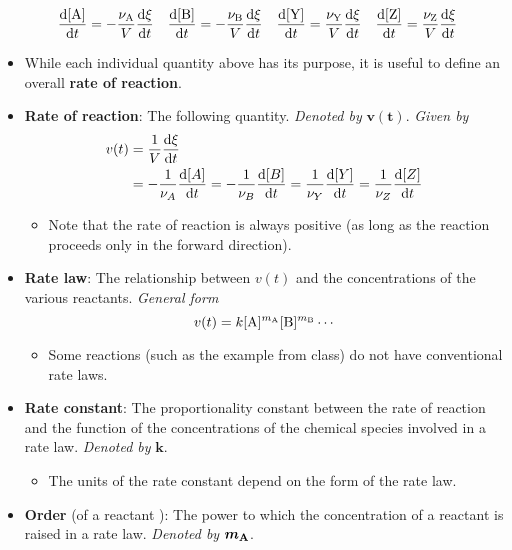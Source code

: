 \documentclass[../notes.tex]{subfiles}
\begin{document}
\begin{itemize}
    \begin{align*}
        \dv{[\ce{A}]}{t} &= -\frac{\nu_{\ce{A}}}{V}\dv{\xi}{t}&
        \dv{[\ce{B}]}{t} &= -\frac{\nu_{\ce{B}}}{V}\dv{\xi}{t}&
        \dv{[\ce{Y}]}{t} &= \frac{\nu_{\ce{Y}}}{V}\dv{\xi}{t}&
        \dv{[\ce{Z}]}{t} &= \frac{\nu_{\ce{Z}}}{V}\dv{\xi}{t}
    \end{align*}
    \item While each individual quantity above has its purpose, it is useful to define an overall \textbf{rate of reaction}.
    \item \textbf{Rate of reaction}: The following quantity. \emph{Denoted by} $\bm{v(t)}$. \emph{Given by}
    \begin{align*}
        v(t) &= \frac{1}{V}\dv{\xi}{t}\\
        &= -\frac{1}{\nu_A}\dv{[A]}{t}
            = -\frac{1}{\nu_B}\dv{[B]}{t}
            = \frac{1}{\nu_Y}\dv{[Y]}{t}
            = \frac{1}{\nu_Z}\dv{[Z]}{t}
    \end{align*}
    \begin{itemize}
        \item Note that the rate of reaction is always positive (as long as the reaction proceeds only in the forward direction).
    \end{itemize}
    \item \textbf{Rate law}: The relationship between $v(t)$ and the concentrations of the various reactants. \emph{General form}
    \begin{equation*}
        v(t) = k[\ce{A}]^{m_{\ce{A}}}[\ce{B}]^{m_{\ce{B}}}\cdots
    \end{equation*}
    \begin{itemize}
        \item Some reactions (such as the  example from class) do not have conventional rate laws.
    \end{itemize}
    \item \textbf{Rate constant}: The proportionality constant between the rate of reaction and the function of the concentrations of the chemical species involved in a rate law. \emph{Denoted by} $\bm{k}$.
    \begin{itemize}
        \item The units of the rate constant depend on the form of the rate law.
    \end{itemize}
    \item \textbf{Order} (of a reactant ): The power to which the concentration of a reactant is raised in a rate law. \emph{Denoted by} $\bm{m_{\ce{A}}}$.

\end{itemize}
\end{document}
